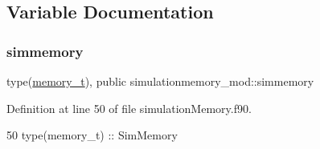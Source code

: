 \subsection{Variable Documentation}
\mbox{\label{namespacesimulationmemory__mod_a47d351637c32a0493b99ed3fb269f22c}} 
\subsubsection{\texorpdfstring{simmemory}{simmemory}}
{\footnotesize\ttfamily type(\mbox{\hyperlink{structsimulationmemory__mod_1_1memory__t}{memory\+\_\+t}}), public simulationmemory\+\_\+mod\+::simmemory}



Definition at line 50 of file simulation\+Memory.\+f90.


\begin{DoxyCode}
50     \textcolor{keywordtype}{type}(memory\_t) :: SimMemory
\end{DoxyCode}
